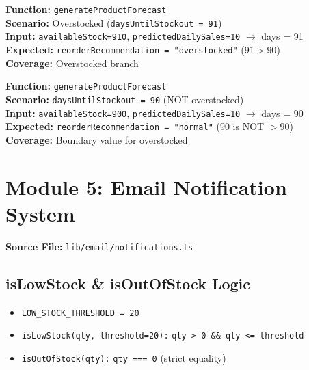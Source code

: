 \documentclass[12pt,a4paper]{report}
\newcommand{\ptwo}{\textbf{\color{p2orange}P2}}
\begin{document}
\begin{tcolorbox}[testbox, title={FORE-022 \hfill \ptwo}]
\textbf{Function:} \texttt{generateProductForecast} \\
\textbf{Scenario:} Overstocked (\texttt{daysUntilStockout = 91}) \\
\textbf{Input:} \texttt{availableStock=910}, \texttt{predictedDailySales=10} $\to$ days = 91 \\
\textbf{Expected:} \texttt{reorderRecommendation = "overstocked"} ($91 > 90$) \\
\textbf{Coverage:} Overstocked branch
\end{tcolorbox}

\begin{tcolorbox}[testbox, title={FORE-023 \hfill \ptwo\ --- Boundary}]
\textbf{Function:} \texttt{generateProductForecast} \\
\textbf{Scenario:} \texttt{daysUntilStockout = 90} (NOT overstocked) \\
\textbf{Input:} \texttt{availableStock=900}, \texttt{predictedDailySales=10} $\to$ days = 90 \\
\textbf{Expected:} \texttt{reorderRecommendation = "normal"} ($90$ is NOT $> 90$) \\
\textbf{Coverage:} Boundary value for overstocked
\end{tcolorbox}



\chapter{Module 5: Email Notification System}

\textbf{Source File:} \texttt{lib/email/notifications.ts}

\section{isLowStock \& isOutOfStock Logic}

\begin{tcolorbox}[infobox, title={Stock Alert Thresholds}]
\begin{itemize}
  \item \texttt{LOW\_STOCK\_THRESHOLD = 20}
  \item \texttt{isLowStock(qty, threshold=20):} \texttt{qty > 0 \&\& qty <= threshold}
  \item \texttt{isOutOfStock(qty):} \texttt{qty === 0} (strict equality)
\end{itemize}
\end{tcolorbox}
\end{document}
